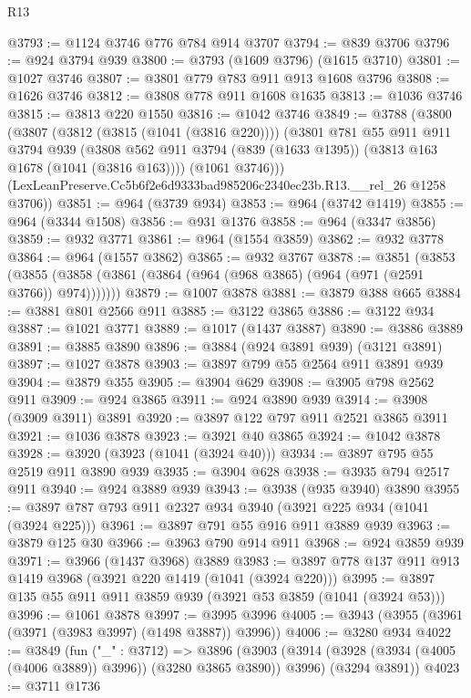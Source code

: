 \begin{lexlean}{R13}
\begin{coremodule}
@3793 := @1124 @3746 @776 @784 @914 @3707
@3794 := @839 @3706
@3796 := @924 @3794 @939
@3800 := @3793 (@1609 @3796) (@1615 @3710)
@3801 := @1027 @3746
@3807 := @3801 @779 @783 @911 @913 @1608 @3796
@3808 := @1626 @3746
@3812 := @3808 @778 @911 @1608 @1635
@3813 := @1036 @3746
@3815 := @3813 @220 @1550
@3816 := @1042 @3746
@3849 := @3788
    (@3800
      (@3807
        (@3812 (@3815 (@1041 (@3816 @220))))
        (@3801
          @781
          @55
          @911
          @911
          @3794
          @939
          (@3808 @562 @911 @3794 (@839 (@1633 @1395)) (@3813 @163 @1678 (@1041 (@3816 @163))))
          (@1061 @3746)))
      (LexLeanPreserve.Cc5b6f2e6d9333bad985206c2340ec23b.R13.__rel_26 @1258 @3706))
@3851 := @964 (@3739 @934)
@3853 := @964 (@3742 @1419)
@3855 := @964 (@3344 @1508)
@3856 := @931 @1376
@3858 := @964 (@3347 @3856)
@3859 := @932 @3771
@3861 := @964 (@1554 @3859)
@3862 := @932 @3778
@3864 := @964 (@1557 @3862)
@3865 := @932 @3767
@3878 := @3851
    (@3853 (@3855 (@3858 (@3861 (@3864 (@964 (@968 @3865) (@964 (@971 (@2591 @3766)) @974)))))))
@3879 := @1007 @3878
@3881 := @3879 @388 @665
@3884 := @3881 @801 @2566 @911
@3885 := @3122 @3865
@3886 := @3122 @934
@3887 := @1021 @3771
@3889 := @1017 (@1437 @3887)
@3890 := @3886 @3889
@3891 := @3885 @3890
@3896 := @3884 (@924 @3891 @939) (@3121 @3891)
@3897 := @1027 @3878
@3903 := @3897 @799 @55 @2564 @911 @3891 @939
@3904 := @3879 @355
@3905 := @3904 @629
@3908 := @3905 @798 @2562 @911
@3909 := @924 @3865
@3911 := @924 @3890 @939
@3914 := @3908 (@3909 @3911) @3891
@3920 := @3897 @122 @797 @911 @2521 @3865 @3911
@3921 := @1036 @3878
@3923 := @3921 @40 @3865
@3924 := @1042 @3878
@3928 := @3920 (@3923 (@1041 (@3924 @40)))
@3934 := @3897 @795 @55 @2519 @911 @3890 @939
@3935 := @3904 @628
@3938 := @3935 @794 @2517 @911
@3940 := @924 @3889 @939
@3943 := @3938 (@935 @3940) @3890
@3955 := @3897 @787 @793 @911 @2327 @934 @3940 (@3921 @225 @934 (@1041 (@3924 @225)))
@3961 := @3897 @791 @55 @916 @911 @3889 @939
@3963 := @3879 @125 @30
@3966 := @3963 @790 @914 @911
@3968 := @924 @3859 @939
@3971 := @3966 (@1437 @3968) @3889
@3983 := @3897 @778 @137 @911 @913 @1419 @3968 (@3921 @220 @1419 (@1041 (@3924 @220)))
@3995 := @3897 @135 @55 @911 @911 @3859 @939 (@3921 @53 @3859 (@1041 (@3924 @53)))
@3996 := @1061 @3878
@3997 := @3995 @3996
@4005 := @3943 (@3955 (@3961 (@3971 (@3983 @3997) (@1498 @3887)) @3996))
@4006 := @3280 @934
@4022 := @3849
    (fun ("_" : @3712) =>
    @3896
      (@3903 (@3914 (@3928 (@3934 (@4005 (@4006 @3889)) @3996)) (@3280 @3865 @3890)) @3996)
      (@3294 @3891))
@4023 := @3711 @1736

\end{coremodule}
\end{lexlean}
